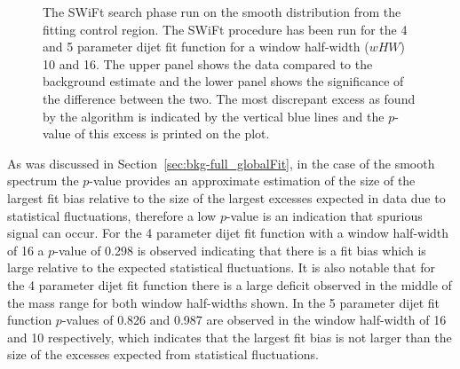\begin{figure}[!htb]
\caption{\label{fig:bhFit_lm_corrFitCR_smooth}
  The SWiFt search phase run on the smooth distribution from the \lm{} fitting control region.
  The SWiFt procedure has been run for the 4 and 5 parameter dijet fit function for a window half-width ($wHW$) 10 and 16.
  The upper panel shows the data compared to the background estimate and the lower panel shows the significance of the difference between the two.
  The most discrepant excess as found by the \bh{} algorithm is indicated by the vertical blue lines and the \mbox{$p$-value} of this excess is printed on the plot. }
\end{figure}

As was discussed in Section~\ref{sec:bkg-full_globalFit}, in the case of the smooth spectrum the \bh{} \mbox{$p$-value} provides an approximate estimation
of the size of the largest fit bias relative to the size of the largest excesses expected in data due to statistical fluctuations,
therefore a low $p$-value is an indication that spurious signal can occur. 
For the 4 parameter dijet fit function with a window half-width of 16 a \bh{} $p$-value of 0.298 is observed indicating that
there is a fit bias which is large relative to the expected statistical fluctuations.
It is also notable that for the 4 parameter dijet fit function there is a large deficit observed in the middle of the mass range for both window half-widths shown.
In the 5 parameter dijet fit function \bh{} $p$-values of 0.826 and 0.987 are observed in the window half-width of 16 and 10 respectively,
which indicates that the largest fit bias is not larger than the size of the excesses expected from statistical fluctuations.

